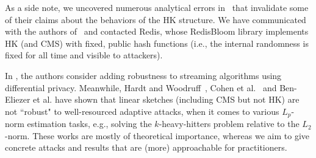 As a side note, we uncovered numerous analytical errors in~\cite{yang2019heavykeeper} that invalidate some of their claims about the behaviors of the HK structure.  We have communicated with the authors of~\cite{yang2019heavykeeper} and contacted Redis, whose RedisBloom library implements HK (and CMS) with fixed, public hash functions (i.e., the internal randomness is fixed for all time and visible to attackers).

In \cite{HassidimKMMS20}, the authors consider adding robustness to streaming algorithms using differential privacy.
Meanwhile, Hardt and Woodruff~\cite{hardt2013}, Cohen et al.~\cite{cohen2022robust} and Ben-Eliezer et al.\cite{BenEliezer2022} have shown that linear sketches (including CMS but not HK) are not ``robust" to well-resourced adaptive attacks, when it comes to various $L_p$-norm estimation tasks, e.g., solving the $k$-heavy-hitters problem relative to the $L_2$-norm.  
These works are mostly of theoretical importance, whereas we aim to give concrete  attacks and results that are (more) approachable for practitioners.
